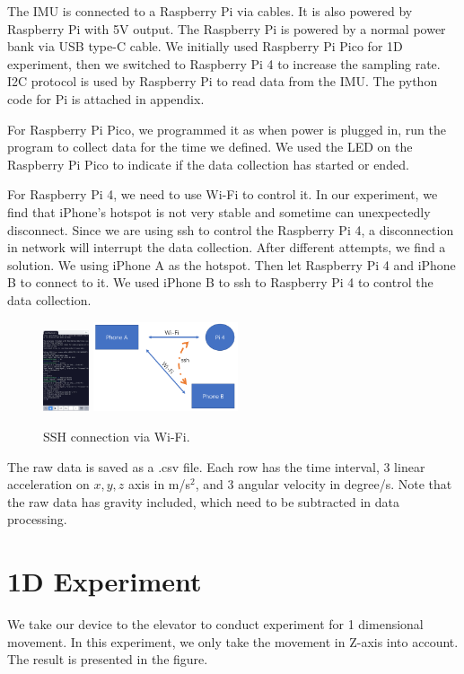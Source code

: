\documentclass[%
 reprint,
 amsmath,amssymb,
 aps,
]{revtex4-2}
\begin{document}
The IMU is connected to a Raspberry Pi via cables. It is also powered by Raspberry Pi with 5V output. The Raspberry Pi is powered by a normal power bank via USB type-C cable. We initially used Raspberry Pi Pico\cite{pico} for 1D experiment, then we switched to Raspberry Pi 4 to increase the sampling rate. I2C protocol\cite{i2c} is used by Raspberry Pi to read data from the IMU. The python code for Pi is attached in appendix.

For Raspberry Pi Pico, we programmed it as when power is plugged in, run the program to collect data for the time we defined. We used the LED on the Raspberry Pi Pico to indicate if the data collection has started or ended.

For Raspberry Pi 4\cite{pi4}, we need to use Wi-Fi to control it. In our experiment, we find that iPhone’s hotspot is not very stable and sometime can unexpectedly disconnect. Since we are using ssh to control the Raspberry Pi 4, a disconnection in network will interrupt the data collection. After different attempts, we find a solution. We using iPhone A as the hotspot. Then let Raspberry Pi 4 and iPhone B to connect to it. We used iPhone B to ssh to Raspberry Pi 4 to control the data collection.
\begin{figure}[H]
\includegraphics[width=0.12\textwidth]{ssh.jpg}
\includegraphics[width=0.38\textwidth]{ssh2.png}
\caption{\label{superman}SSH connection via Wi-Fi.}
\end{figure}

The raw data is saved as a .csv file. Each row has the time interval, 3 linear acceleration on $x, y, z$ axis in m/s$^2$, and 3 angular velocity in degree/s. Note that the raw data has gravity included, which need to be subtracted in data processing.

\section{\label{1Dexperiment}1D Experiment}
We take our device to the elevator to conduct experiment for 1 dimensional movement. In this experiment, we only take the movement in Z-axis into account. The result is presented in the figure.
\end{document}
